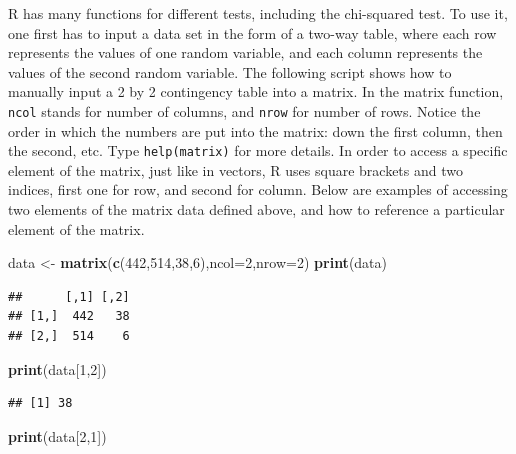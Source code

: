 \documentclass[
]{book}
\newenvironment{Shaded}{\begin{snugshade}}{\end{snugshade}}
\newcommand{\DataTypeTok}[1]{\textcolor[rgb]{0.13,0.29,0.53}{#1}}
\newcommand{\DecValTok}[1]{\textcolor[rgb]{0.00,0.00,0.81}{#1}}
\newcommand{\KeywordTok}[1]{\textcolor[rgb]{0.13,0.29,0.53}{\textbf{#1}}}
\newcommand{\NormalTok}[1]{#1}
\newcommand{\StringTok}[1]{\textcolor[rgb]{0.31,0.60,0.02}{#1}}
\theoremstyle{definition}
\theoremstyle{definition}
\theoremstyle{definition}
\theoremstyle{remark}
\begin{document}
\label{sec:comp6}

R has many functions for different tests, including the chi-squared test. To use it, one first has to input a data set in the form of a two-way table, where each row represents the values of one random variable, and each column represents the values of the second random variable. The following script shows how to manually input a 2 by 2 contingency table into a matrix. In the matrix function, \texttt{ncol} stands for number of columns, and \texttt{nrow} for number of rows. Notice the order in which the numbers are put into the matrix: down the first column, then the second, etc. Type \texttt{help(matrix)} for more details. In order to access a specific element of the matrix, just like in vectors, R uses square brackets and two indices, first one for row, and second for column. Below are examples of accessing two elements of the matrix data defined above, and how to reference a particular element of the matrix.

\begin{Shaded}
\begin{Highlighting}[]
\NormalTok{data \textless{}{-}}\StringTok{ }\KeywordTok{matrix}\NormalTok{(}\KeywordTok{c}\NormalTok{(}\DecValTok{442}\NormalTok{,}\DecValTok{514}\NormalTok{,}\DecValTok{38}\NormalTok{,}\DecValTok{6}\NormalTok{),}\DataTypeTok{ncol=}\DecValTok{2}\NormalTok{,}\DataTypeTok{nrow=}\DecValTok{2}\NormalTok{)}
\KeywordTok{print}\NormalTok{(data)}
\end{Highlighting}
\end{Shaded}

\begin{verbatim}
##      [,1] [,2]
## [1,]  442   38
## [2,]  514    6
\end{verbatim}

\begin{Shaded}
\begin{Highlighting}[]
\KeywordTok{print}\NormalTok{(data[}\DecValTok{1}\NormalTok{,}\DecValTok{2}\NormalTok{])}
\end{Highlighting}
\end{Shaded}

\begin{verbatim}
## [1] 38
\end{verbatim}

\begin{Shaded}
\begin{Highlighting}[]
\KeywordTok{print}\NormalTok{(data[}\DecValTok{2}\NormalTok{,}\DecValTok{1}\NormalTok{])}
\end{Highlighting}
\end{Shaded}
\end{document}
